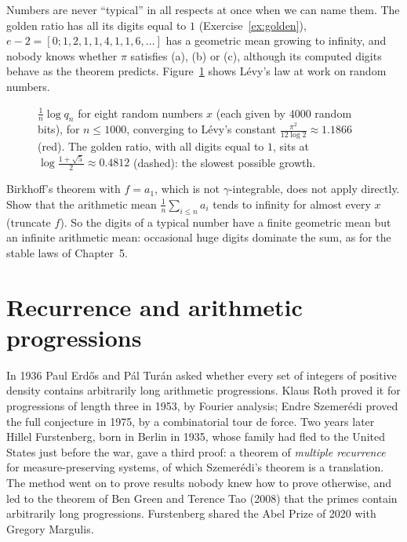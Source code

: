 Numbers are never ``typical'' in all respects at once when we can name them. The golden ratio has all its digits equal to $1$ (Exercise~\ref{ex:golden}), $e-2=[0;1,2,1,1,4,1,1,6,\dots]$ has a geometric mean growing to infinity, and
nobody knows whether $\pi$ satisfies (a), (b) or (c), although its computed digits behave as the theorem predicts. Figure~\ref{fig:levy} shows L\'evy's law at work on random numbers.

\begin{figure}[ht]
\centering{}
\caption{$\frac1n\log q_n$ for eight random numbers $x$ (each given by $4000$ random bits), for $n\le1000$, converging to L\'evy's constant $\frac{\pi^2}{12\log2}\approx1.1866$ (red). The golden ratio, with all digits equal to $1$, sits at $\log\frac{1+\sqrt5}2\approx0.4812$
(dashed): the slowest possible growth.}
\label{fig:levy}
\end{figure}

\begin{think}
Birkhoff's theorem with $f=a_1$, which is not $\gamma$-integrable, does not apply directly. Show that the arithmetic mean $\frac1n\sum_{i\le n}a_i$ tends to infinity for almost every $x$ (truncate $f$). So the
digits of a typical number have a finite geometric mean but an infinite arithmetic mean: occasional huge digits dominate the sum, as for the stable laws of Chapter~5.
\end{think}

\section{Recurrence and arithmetic progressions}

In 1936 Paul Erd\H{o}s and P\'al Tur\'an asked whether every set of integers of positive density contains arbitrarily long arithmetic progressions. Klaus Roth proved it for progressions of length three in 1953,
by Fourier analysis; Endre Szemer\'edi proved the full conjecture in 1975, by a combinatorial tour de force. Two years later Hillel Furstenberg, born in Berlin in 1935, whose family had fled to the United
States just before the war, gave a third proof: a theorem of \emph{multiple recurrence} for measure-preserving systems, of which Szemer\'edi's theorem is a translation. The method went on to prove results nobody
knew how to prove otherwise, and led to the theorem of Ben Green and Terence Tao (2008) that the primes contain arbitrarily long progressions. Furstenberg shared the Abel Prize of 2020 with Gregory Margulis.

